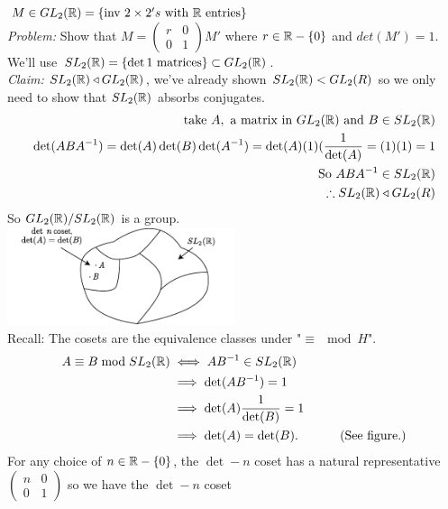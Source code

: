 \begin{example}
\label{ex:DecomposeGLtoSL}
$M\in GL_2({\mathbb{ R}})= \{\text{inv }2\times 2's \text{ with }{\mathbb{ R}} \text{ entries}\}$\steezybreak\\
\textit{Problem:} Show that $M=\begin{pmatrix}
r & 0 \\
0 & 1
\end{pmatrix}M'$ where $r\in {\mathbb{ R}}-\{0\}$ and $det(M')=1$.\steezybreak\\
We'll use $SL_2({\mathbb{ R}})=\{\det 1 \text{ matrices}\}\subset GL_2({\mathbb{ R}})$.\steezybreak\\
\textit{Claim:} $SL_2({\mathbb{ R}})\triangleleft GL_2({\mathbb{ R}})$, we've already shown $SL_2({\mathbb{ R}})<GL_2(R)$ so we only need to show that $SL_2({\mathbb{ R}})$ absorbs conjugates.
\begin{align}
    \text{take }A, \text{ a matrix in } GL_2({\mathbb{ R}}) \text{ and } B \in SL_2({\mathbb{ R}})\nonumber\\
    \det(ABA^{-1})=\det(A)\det(B)\det(A^{-1})=\det(A)(1)(\frac{1}{\det(A)}= (1)(1)=1 \nonumber \\
    \text{So } ABA^{-1}\in SL_2({\mathbb{ R}}) \nonumber \\
    \therefore SL_2({\mathbb{ R}}) \triangleleft GL_2(R) \nonumber 
\end{align}
So $GL_2({\mathbb{ R}})/SL_2({\mathbb{ R}})$ is a group.\steezybreak\\
\includegraphics[width=0.5\textwidth]{Figures/aside_sl2(R).pdf}\steezybreak\\
Recall: The cosets are the equivalence classes under "$\equiv \mod H$".
\begin{align}
    A\equiv B \bmod SL_2({\mathbb{ R}}) &\iff AB^{-1}\in SL_2({\mathbb{ R}}) \nonumber \\
    &\implies \det(AB^{-1})=1 \nonumber \\
    &\implies \det(A)\frac{1}{\det(B)}=1 \nonumber\\
    &\implies \det(A)=\det(B). \ \ \ \ \ \ \ \ \ \text{ (See figure.)}\nonumber 
\end{align}
For any choice of $n\in {\mathbb{ R}}-\{0\}$, the $\det -n$ coset has a natural representative $\begin{pmatrix}
n & 0 \\
0 & 1
\end{pmatrix}$ so we have the $\det-n$ coset

\end{example}
